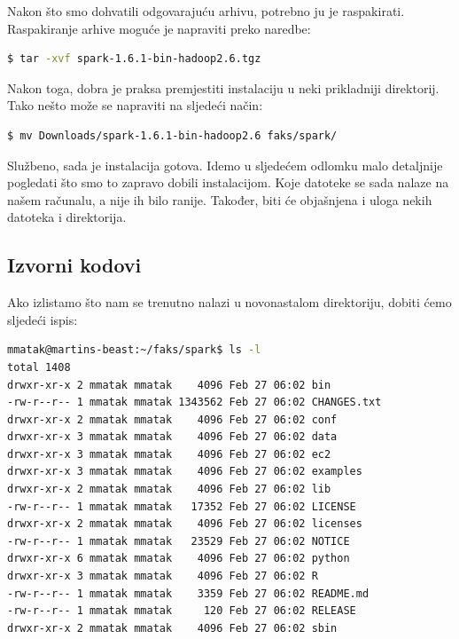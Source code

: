 \documentclass[times, utf8, zavrsni]{fer}
\begin{document}
Nakon što smo dohvatili odgovarajuću arhivu, potrebno ju je raspakirati.\\ Raspakiranje arhive moguće je napraviti preko naredbe:
\begin{lstlisting}[language=bash]
$ tar -xvf spark-1.6.1-bin-hadoop2.6.tgz
\end{lstlisting}
Nakon toga, dobra je praksa premjestiti instalaciju u neki prikladniji direktorij. Tako nešto može se napraviti na sljedeći način:
\begin{lstlisting}[language=bash]
$ mv Downloads/spark-1.6.1-bin-hadoop2.6 faks/spark/
\end{lstlisting}
Službeno, sada je instalacija gotova. Idemo u sljedećem odlomku malo detaljnije pogledati što smo to zapravo dobili instalacijom. Koje datoteke se sada nalaze na našem računalu, a nije ih bilo ranije. Također, biti će objašnjena i uloga nekih datoteka i direktorija.

\subsection{Izvorni kodovi}
Ako izlistamo što nam se trenutno nalazi u novonastalom direktoriju, dobiti ćemo sljedeći ispis:
\begin{lstlisting}[language=bash]
mmatak@martins-beast:~/faks/spark$ ls -l
total 1408
drwxr-xr-x 2 mmatak mmatak    4096 Feb 27 06:02 bin
-rw-r--r-- 1 mmatak mmatak 1343562 Feb 27 06:02 CHANGES.txt
drwxr-xr-x 2 mmatak mmatak    4096 Feb 27 06:02 conf
drwxr-xr-x 3 mmatak mmatak    4096 Feb 27 06:02 data
drwxr-xr-x 3 mmatak mmatak    4096 Feb 27 06:02 ec2
drwxr-xr-x 3 mmatak mmatak    4096 Feb 27 06:02 examples
drwxr-xr-x 2 mmatak mmatak    4096 Feb 27 06:02 lib
-rw-r--r-- 1 mmatak mmatak   17352 Feb 27 06:02 LICENSE
drwxr-xr-x 2 mmatak mmatak    4096 Feb 27 06:02 licenses
-rw-r--r-- 1 mmatak mmatak   23529 Feb 27 06:02 NOTICE
drwxr-xr-x 6 mmatak mmatak    4096 Feb 27 06:02 python
drwxr-xr-x 3 mmatak mmatak    4096 Feb 27 06:02 R
-rw-r--r-- 1 mmatak mmatak    3359 Feb 27 06:02 README.md
-rw-r--r-- 1 mmatak mmatak     120 Feb 27 06:02 RELEASE
drwxr-xr-x 2 mmatak mmatak    4096 Feb 27 06:02 sbin
\end{lstlisting}
\end{document}

